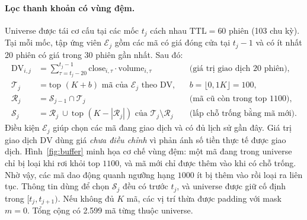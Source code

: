 \documentclass[a4paper,12pt]{article}
\begin{document}
\paragraph{Lọc thanh khoản có vùng đệm.} Universe được tái cơ cấu tại các mốc $t_j$ cách nhau $\mathrm{TTL}=60$ phiên (103 chu kỳ). Tại mỗi mốc, tập ứng viên $\mathcal{E}_j$ gồm các mã có giá đóng cửa tại $t_j-1$ và có ít nhất 20 phiên có giá trong 30 phiên gần nhất. Sau đó:
\begin{align}
    \mathrm{DV}_{i,j} &= \textstyle\sum_{\tau=t_j-20}^{t_j-1}\mathrm{close}_{i,\tau}\cdot\mathrm{volume}_{i,\tau} && \text{(giá trị giao dịch 20 phiên)},\\
    \mathcal{T}_j &= \text{top } (K+b) \text{ mã của } \mathcal{E}_j \text{ theo } \mathrm{DV}, && b=\lfloor 0{,}1K\rfloor = 100,\\
    \mathcal{R}_j &= \mathcal{S}_{j-1}\cap\mathcal{T}_j && \text{(mã cũ còn trong top 1100)},\\
    \mathcal{S}_j &= \mathcal{R}_j\ \cup\ \text{top } (K-|\mathcal{R}_j|) \text{ của } \mathcal{T}_j\setminus\mathcal{R}_j && \text{(lấp chỗ trống bằng mã mới)}.
\end{align}
Điều kiện $\mathcal{E}_j$ giúp chọn các mã đang giao dịch và có đủ lịch sử gần đây. Giá trị giao dịch $\mathrm{DV}$ dùng giá \emph{chưa điều chỉnh} vì phản ánh số tiền thực tế được giao dịch. Hình~\ref{fig:buffer} minh họa cơ chế vùng đệm: một mã đang trong universe chỉ bị loại khi rơi khỏi top $1100$, và mã mới chỉ được thêm vào khi có chỗ trống. Nhờ vậy, các mã dao động quanh ngưỡng hạng $1000$ ít bị thêm vào rồi loại ra liên tục. Thông tin dùng để chọn $\mathcal{S}_j$ đều có trước $t_j$, và universe được giữ cố định trong $[t_j, t_{j+1})$. Nếu không đủ $K$ mã, các vị trí thừa được padding với mask $m=0$. Tổng cộng có 2.599 mã từng thuộc universe.
\end{document}
